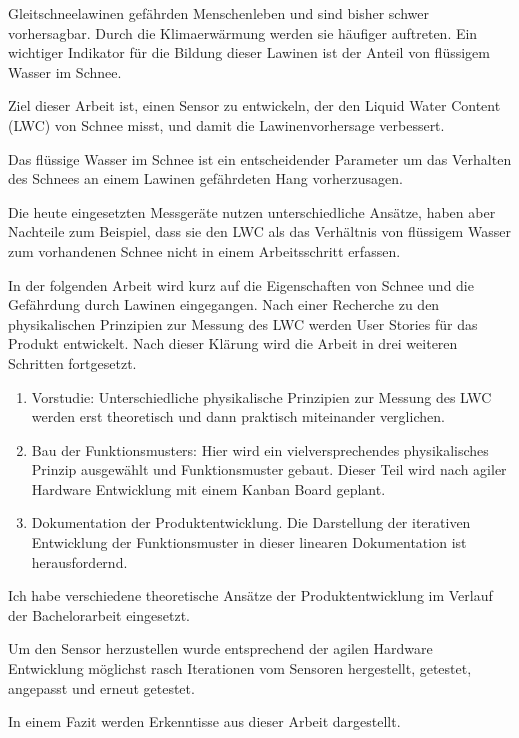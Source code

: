 Gleitschneelawinen gefährden Menschenleben und sind bisher schwer vorhersagbar. Durch die Klimaerwärmung werden sie häufiger auftreten. Ein wichtiger Indikator für die Bildung dieser Lawinen ist der Anteil von flüssigem Wasser im Schnee.

Ziel dieser Arbeit ist, einen Sensor zu entwickeln, der den Liquid Water Content (LWC) von Schnee misst, und damit die Lawinenvorhersage verbessert.


Das flüssige Wasser im Schnee ist ein entscheidender Parameter um das Verhalten des Schnees an einem Lawinen gefährdeten Hang  vorherzusagen. 

Die heute eingesetzten Messgeräte nutzen unterschiedliche Ansätze, haben aber Nachteile zum Beispiel, dass sie den LWC als das Verhältnis von flüssigem Wasser zum vorhandenen Schnee nicht in einem Arbeitsschritt erfassen.

In der folgenden Arbeit wird kurz auf die Eigenschaften von Schnee und die Gefährdung durch Lawinen eingegangen. Nach einer Recherche zu den physikalischen Prinzipien zur Messung des LWC werden User Stories für das Produkt entwickelt. Nach dieser Klärung wird die Arbeit in drei weiteren Schritten fortgesetzt.

\begin{enumerate}
\item Vorstudie: Unterschiedliche physikalische Prinzipien zur Messung des LWC werden erst theoretisch und dann praktisch miteinander verglichen.

\item Bau der Funktionsmusters:  Hier wird ein vielversprechendes physikalisches Prinzip ausgewählt und Funktionsmuster gebaut. Dieser Teil wird nach agiler Hardware Entwicklung mit einem Kanban Board geplant. 

\item Dokumentation der Produktentwicklung. Die Darstellung der iterativen Entwicklung der Funktionsmuster in dieser linearen Dokumentation ist herausfordernd.
\end{enumerate}

Ich habe verschiedene theoretische Ansätze der Produktentwicklung im Verlauf der Bachelorarbeit eingesetzt.

Um den Sensor herzustellen wurde entsprechend der agilen Hardware Entwicklung möglichst rasch Iterationen vom Sensoren hergestellt, getestet, angepasst und erneut getestet.

In einem Fazit werden Erkenntisse aus dieser Arbeit dargestellt.

